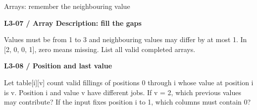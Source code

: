 \documentclass[11pt,a4paper]{article}
\begin{document}
\par\noindent\begin{minipage}{\linewidth}
{\heavy\fontsize{12}{15}\selectfont Arrays: remember the neighbouring value\par}\medskip
\textbf{L3-07 / Array Description: fill the gaps}\par\smallskip Values must be from 1 to 3 and neighbouring values may differ by at most 1. In [2, 0, 0, 1], zero means missing. List all valid completed arrays.\par
\end{minipage}\par\vspace{4mm}
\par\noindent\begin{minipage}{\linewidth}
\textbf{L3-08 / Position and last value}\par\smallskip Let table[i][v] count valid fillings of positions 0 through i whose value at position i is v. Position i and value v have different jobs. If v = 2, which previous values may contribute? If the input fixes position i to 1, which columns must contain 0?\par
\end{minipage}\par\vspace{4mm}
\end{document}
